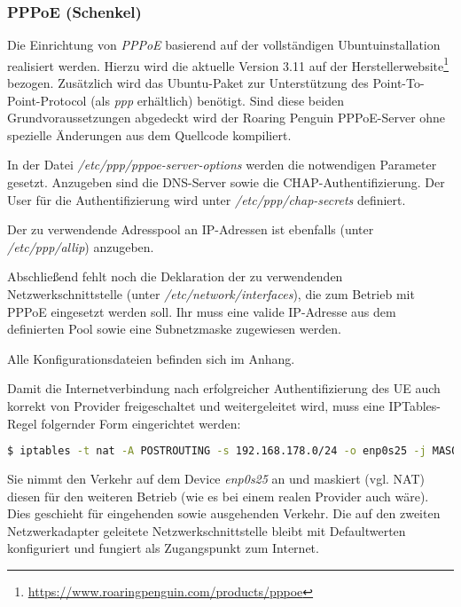     	\subsubsection{PPPoE (Schenkel)}
    	Die Einrichtung von \textit{PPPoE} basierend auf der vollständigen Ubuntuinstallation realisiert werden. Hierzu wird die aktuelle
    	Version 3.11 auf der Herstellerwebsite\footnote{\url{https://www.roaringpenguin.com/products/pppoe}}
    	bezogen. Zusätzlich wird das Ubuntu-Paket zur Unterstützung
    	des Point-To-Point-Protocol (als \textit{ppp} erhältlich) benötigt. Sind diese beiden Grundvoraussetzungen
    	abgedeckt wird der Roaring Penguin PPPoE-Server ohne spezielle Änderungen aus dem Quellcode kompiliert.

    	In der Datei \textit{/etc/ppp/pppoe-server-options} werden die notwendigen Parameter gesetzt. Anzugeben
    	sind die DNS-Server sowie die CHAP-Authentifizierung. Der User für die Authentifizierung
    	wird unter \textit{/etc/ppp/chap-secrets} definiert.

    	Der zu verwendende Adresspool an IP-Adressen ist ebenfalls (unter \textit{/etc/ppp/allip}) anzugeben.

    	Abschließend fehlt noch die Deklaration der zu verwendenden Netzwerkschnittstelle (unter \textit{/etc/network/interfaces}),
    	die zum Betrieb mit PPPoE eingesetzt werden soll. Ihr muss eine valide IP-Adresse aus dem definierten
    	Pool sowie eine Subnetzmaske zugewiesen werden.

    	Alle Konfigurationsdateien befinden sich im Anhang. %

    	Damit die Internetverbindung nach erfolgreicher Authentifizierung des UE auch
    	korrekt von Provider freigeschaltet und weitergeleitet wird, muss eine IPTables-Regel
    	folgernder Form eingerichtet werden:

    	\begin{lstlisting}[language=bash]
		$ iptables -t nat -A POSTROUTING -s 192.168.178.0/24 -o enp0s25 -j MASQUERADE
	\end{lstlisting}

	Sie nimmt den Verkehr auf dem Device \textit{enp0s25} an und maskiert (vgl. \ac{NAT}) diesen
	für den weiteren Betrieb (wie es bei einem realen Provider auch wäre). Dies geschieht
	für eingehenden sowie ausgehenden Verkehr. Die auf den zweiten Netzwerkadapter geleitete
	Netzwerkschnittstelle bleibt mit Defaultwerten konfiguriert und fungiert als Zugangspunkt
	zum Internet.

